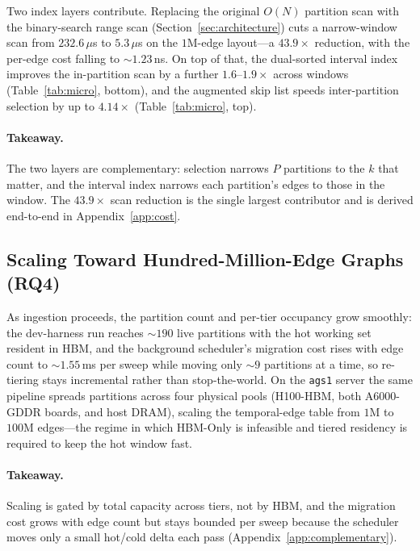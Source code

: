 \documentclass[10pt]{article}
\theoremstyle{definition}
\begin{document}
Two index layers contribute. Replacing the original $O(N)$ partition scan with the
binary-search range scan (Section~\ref{sec:architecture}) cuts a narrow-window scan
from $232.6\,\mu$s to $5.3\,\mu$s on the $1$M-edge layout---a $\mathbf{43.9\times}$
reduction, with the per-edge cost falling to ${\sim}1.23$\,ns. On top of that, the
dual-sorted interval index improves the in-partition scan by a further
$1.6$--$1.9\times$ across windows (Table~\ref{tab:micro}, bottom), and the augmented
skip list speeds inter-partition selection by up to $4.14\times$
(Table~\ref{tab:micro}, top).

\paragraph{Takeaway.}
The two layers are complementary: selection narrows $P$ partitions to the $k$ that
matter, and the interval index narrows each partition's edges to those in the window.
The $43.9\times$ scan reduction is the single largest contributor and is derived
end-to-end in Appendix~\ref{app:cost}.

\subsection{Scaling Toward Hundred-Million-Edge Graphs (RQ4)}
\label{sec:rq4}

As ingestion proceeds, the partition count and per-tier occupancy grow smoothly: the
dev-harness run reaches ${\sim}190$ live partitions with the hot working set resident
in HBM, and the background scheduler's migration cost rises with edge count to
${\sim}1.55$\,ms per sweep while moving only ${\sim}9$ partitions at a time, so
re-tiering stays incremental rather than stop-the-world. On the \texttt{ags1} server
the same pipeline spreads partitions across four physical pools (H100-HBM, both
A6000-GDDR boards, and host DRAM), scaling the temporal-edge table from $1$M to
$100$M edges---the regime in which HBM-Only is infeasible and tiered residency is
required to keep the hot window fast.

\paragraph{Takeaway.}
Scaling is gated by total capacity across tiers, not by HBM, and the migration cost
grows with edge count but stays bounded per sweep because the scheduler moves only a
small hot/cold delta each pass (Appendix~\ref{app:complementary}).
\end{document}
